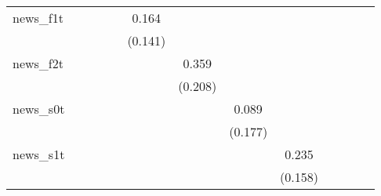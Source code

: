 {\begin{tabular}{l*{12}{c}}
\addlinespace
news\_f1t    &                     &                     &                     &                     &       0.164         &                     &                     &                     &                     &                     &                     &                     \\
            &                     &                     &                     &                     &     (0.141)         &                     &                     &                     &                     &                     &                     &                     \\
\addlinespace
news\_f2t    &                     &                     &                     &                     &                     &       0.359\sym{*}  &                     &                     &                     &                     &                     &                     \\
            &                     &                     &                     &                     &                     &     (0.208)         &                     &                     &                     &                     &                     &                     \\
\addlinespace
news\_s0t    &                     &                     &                     &                     &                     &                     &       0.089         &                     &                     &                     &                     &                     \\
            &                     &                     &                     &                     &                     &                     &     (0.177)         &                     &                     &                     &                     &                     \\
\addlinespace
news\_s1t    &                     &                     &                     &                     &                     &                     &                     &       0.235         &                     &                     &                     &                     \\
            &                     &                     &                     &                     &                     &                     &                     &     (0.158)         &                     &                     &                     &                     \\

\end{tabular}}

